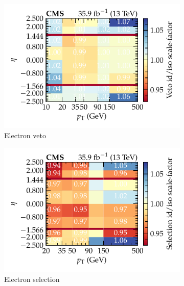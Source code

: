 \begin{figure}[htbp]
    \centering
    \begin{subfigure}[b]{0.49\textwidth}
        \centering
        \includegraphics{chapters/041_corrections/images/efficiencies/objects/electrons/electron_idiso_veto_sf.pdf}
        \caption{Electron veto}
        \label{subfiga:egamma-id-iso-efficiency}
    \end{subfigure}
    \hfill
    \begin{subfigure}[b]{0.49\textwidth}
        \centering
        \includegraphics{chapters/041_corrections/images/efficiencies/objects/electrons/electron_idiso_tight_sf.pdf}
        \caption{Electron selection}
        \label{subfigb:egamma-id-iso-efficiency}
    \end{subfigure}
    \\
    \begin{subfigure}[b]{0.49\textwidth}

\end{subfigure}
\end{figure}
